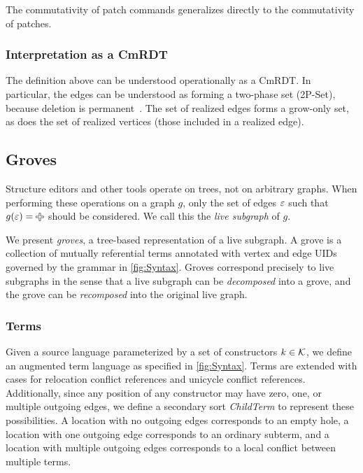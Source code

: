 The commutativity of patch commands generalizes directly to the commutativity of patches. 

\subsubsection{Interpretation as a CmRDT}

The definition above can be understood operationally as a CmRDT. In particular, the edges can be understood as forming a two-phase set (2P-Set), because deletion is permanent~\cite{shapiro2011conflict}. The set of realized edges forms a grow-only set, as does the set of realized vertices (those included in a realized edge).

\subsection{Groves}%
\label{sub:Groves}

Structure editors and other tools operate on trees, not on arbitrary graphs. When performing these operations on a graph $g$, only the set of edges $\varepsilon$ such that $g(\e) = \Plus$ should be considered. We call this the \textit{live subgraph} of $g$.

We present \textit{groves}, a tree-based representation of a live subgraph. A grove is a collection of mutually referential terms annotated with vertex and edge UIDs governed by the grammar in \autoref{fig:Syntax}. Groves correspond precisely to live subgraphs in the sense that a live subgraph can be \emph{decomposed} into a grove, and the grove can be \emph{recomposed} into the original live graph.

\subsubsection{Terms}%
\label{subsub:Terms}

\figureTermSyntax

Given a source language parameterized by a set of constructors $k \in \mathcal{K}$, we define an augmented term language as specified in \autoref{fig:Syntax}. Terms are extended with cases for relocation conflict references and unicycle conflict references. Additionally, since any position of any constructor may have zero, one, or multiple outgoing edges, we define a secondary sort \textit{ChildTerm} to represent these possibilities. A location with no outgoing edges corresponds to an empty hole, a location with one outgoing edge corresponds to an ordinary subterm, and a location with multiple outgoing edges corresponds to a local conflict between multiple terms. 

